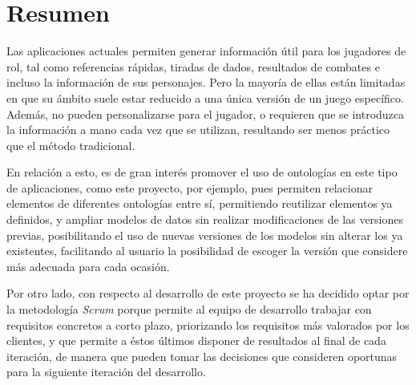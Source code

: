 
\section{Resumen}
Las aplicaciones actuales permiten generar información útil para los jugadores de rol, tal como referencias rápidas, 
tiradas de dados, resultados de combates e incluso la información de sus personajes. Pero la mayoría de ellas están limitadas
en que su ámbito suele estar reducido a una única versión de un juego específico. Además, no pueden personalizarse para el jugador, 
o requieren que se introduzca la información a mano cada vez que se utilizan, resultando ser menos práctico que el método tradicional.
\medskip

En relación a esto, es de gran interés promover el uso de ontologías en este tipo de aplicaciones, como este proyecto, por ejemplo, 
pues permiten relacionar elementos de diferentes ontologías entre sí, permitiendo reutilizar elementos ya definidos, y ampliar
modelos de datos sin realizar modificaciones de las versiones previas, posibilitando el uso de nuevas versiones de los modelos
sin alterar los ya existentes, facilitando al usuario la posibilidad de escoger la versión que considere más adecuada para cada ocasión.
\medskip

Por otro lado, con respecto al desarrollo de este proyecto se ha decidido optar por la metodología \textit{Scrum} porque 
permite al equipo de desarrollo trabajar con requisitos concretos a corto plazo, priorizando los requisitos más valorados 
por los clientes, y que permite a éstos últimos disponer de resultados al final de cada iteración, de manera que pueden 
tomar las decisiones que consideren oportunas para la siguiente iteración del desarrollo.

